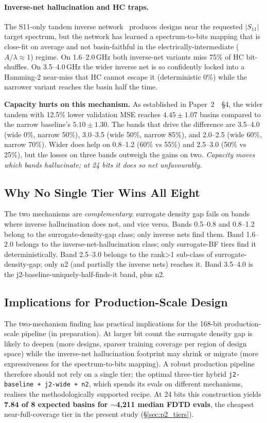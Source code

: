 \paragraph{Inverse-net hallucination and HC traps.}
The S11-only tandem inverse network~\cite{Liu2018Tandem} produces
designs near the requested $|S_{11}|$ target spectrum, but the
network has learned a spectrum-to-bits mapping that is close-fit on
average and not basin-faithful in the
electrically-intermediate ($A/\lambda \approx 1$) regime. On 1.6--2.0\,GHz both
inverse-net variants miss 75\% of HC bit-shuffles. On 3.5--4.0\,GHz
the wider inverse net is so confidently locked into a Hamming-2
near-miss that HC cannot escape it (deterministic 0\%) while the
narrower variant reaches the basin half the time.

\textbf{Capacity hurts on this mechanism.} As established in
Paper~2~\cite{Maloney2026Paper2}~\S 4, the wider tandem with 12.5\% lower validation
MSE reaches $4.45 \pm 1.07$ basins compared to the narrow baseline's
$5.10 \pm 1.30$. The bands that drive the difference are 3.5--4.0
(wide 0\%, narrow 50\%), 3.0--3.5 (wide 50\%, narrow 85\%), and
2.0--2.5 (wide 60\%, narrow 70\%). Wider does help on 0.8--1.2
(60\% vs 55\%) and 2.5--3.0 (50\% vs 25\%), but the losses on three
bands outweigh the gains on two. \emph{Capacity moves which bands
hallucinate; at 24 bits it does so net unfavourably.}

\subsection{Why No Single Tier Wins All Eight}

The two mechanisms are \emph{complementary}: surrogate density gap
fails on bands where inverse hallucination does not, and vice versa.
Bands 0.5--0.8 and 0.8--1.2 belong to the surrogate-density-gap
class; only inverse nets find them. Band 1.6--2.0 belongs to the
inverse-net-hallucination class; only surrogate-BF tiers find it
deterministically. Band 2.5--3.0 belongs to the rank>1 sub-class of
surrogate-density-gap; only n2 (and partially the inverse nets)
reaches it. Band 3.5--4.0 is the j2-baseline-uniquely-half-finds-it
band, plus n2.

\subsection{Implications for Production-Scale Design}

The two-mechanism finding has practical implications for the
168-bit production-scale pipeline (in preparation). At larger bit
count the surrogate density gap is likely to deepen (more designs,
sparser training coverage per region of design space) while the
inverse-net hallucination footprint may shrink or migrate (more
expressiveness for the spectrum-to-bits mapping). A robust production
pipeline therefore should not rely on a single tier; the optimal
three-tier hybrid \texttt{j2-baseline + j2-wide + n2}, which spends
its evals on different mechanisms, realises the methodologically
supported recipe. At 24 bits this construction yields
\textbf{7.84 of 8 expected basins for $\sim$4{,}211 median FDTD
evals}, the cheapest near-full-coverage tier in the present study
(\S\ref{sec:p2_tiers}).

